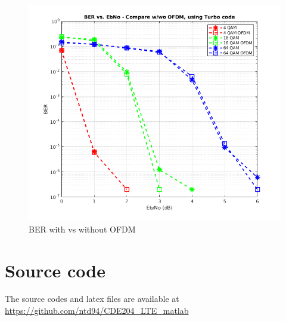 \documentclass[12pt]{article}
\begin{document}
\begin{figure}[ht]
    \includegraphics[width=\textwidth]{test_qam_M_turbo_OFDM_2}
    \caption{BER with vs without OFDM}
\end{figure}

\section{Source code}

The source codes and latex files are available at \url{https://github.com/ntd94/CDE204_LTE_matlab}
\end{document}
